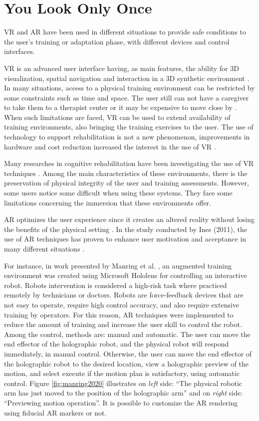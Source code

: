 \section{You Look Only Once}
\label{sec:vareality}

VR and AR have been used in different situations to provide safe conditions to the user's training or adaptation phase, with different devices and control interfaces. 

VR is an advanced user interface having, as main features, the ability for 3D visualization, spatial navigation and interaction in a 3D synthetic environment \cite{tori2006}. In many situations, access to a physical training environment can be restricted by some constraints such as time and space. The user still can not have a caregiver to take them to a therapist center or it may be expensive to move close by \cite{mitsumura2014}. When such limitations are faced, VR can be used to extend availability of training environments, also bringing the training exercises to the user. The use of technology to support rehabilitation is not a new phenomenon, improvements in hardware and cost reduction increased the interest in the use of VR \cite{wiederhold2019,powell2014}. 

Many researches in cognitive rehabilitation have been investigating the use of  VR techniques \cite{vailland2019,john2018, kamaraj2016, mahajan2013}. Among the main characteristics of these environments, there is the preservation of physical integrity of the user and training assessments. However, some users notice some difficult when using these systems. They face some limitations concerning the immersion that these environments offer.

AR optimizes the user experience since it creates an altered reality without losing the benefits of the physical setting \cite{wiederhold2019}. In the study conducted by Ines (2011), the use of AR techniques has proven to enhance user motivation and acceptance in many different situations \cite{ines2011}. 

For instance, in work presented by Manring et al. \cite{manring2020}, an augmented training environment was created using  Microsoft Hololens for controlling an interactive robot. Robots intervention is considered a high-risk task where practiced remotely by technicians or doctors. Robots are force-feedback devices that are not easy to operate, require high control accuracy, and also require extensive training by operators. For this reason, AR techniques were implemented to reduce the amount of training and increase the user skill to control the robot. Among the control, methods are: manual and automatic. The user can move the end effector of the holographic robot, and the physical robot will respond immediately, in manual control. Otherwise,  the user can move the end effector of the holographic robot to the desired location, view a holographic preview of the motion, and select execute if the motion plan is satisfactory, using automatic control. Figure \ref{fig:manring2020} illustrates  on \textit{left} side: ``The physical robotic arm has just moved to the position of the holographic arm'' and on \textit{right} side: ``Previewing motion operation''. It is possible to customize the AR rendering using fiducial AR markers or not. 


